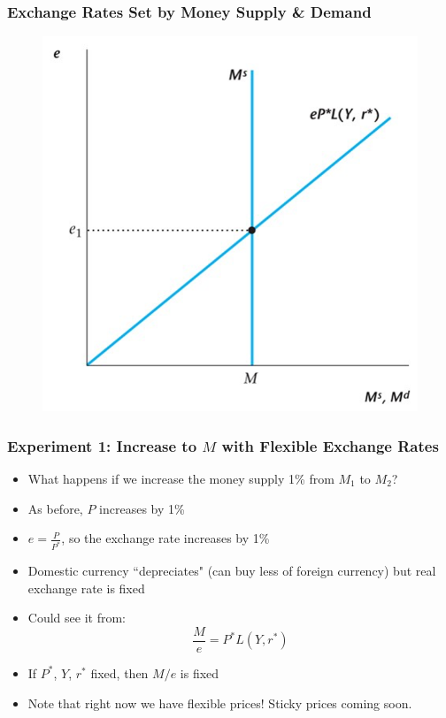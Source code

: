 \documentclass{beamer}
\begin{document}
\begin{frame}
\frametitle[alignment=center]{Exchange Rates Set by Money Supply \& Demand}
\begin{figure}
\centering
\includegraphics[scale=0.73]{Figures/W_Fig_17pt3.png}
\end{figure}
\end{frame}

\begin{frame}
\frametitle[alignment=center]{Experiment 1: Increase to $M$ with Flexible Exchange Rates}
\begin{itemize}
\item What happens if we increase the money supply 1\% from  $M_1$ to $M_2$?
\bigskip
\item As before, $P$ increases by 1\%
\bigskip
\item $e=\frac{P}{P^*}$, so the exchange rate increases by 1\%
\bigskip
\item Domestic currency ``depreciates" (can buy less of foreign currency) but real exchange rate is fixed
\bigskip
\item Could see it from:
$$\frac{M}{e}=P^*L(Y,r^*)$$
\item If $P^*$, $Y$, $r^*$ fixed, then $M/e$ is fixed
\bigskip
\item Note that right now we have flexible prices!  Sticky prices coming soon.
\end{itemize}
\end{frame}
\end{document}
